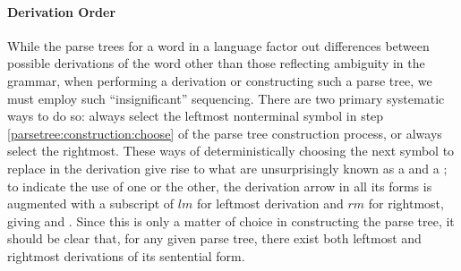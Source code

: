 \paragraph{Derivation Order} While the parse trees for a word in a language factor out differences between possible derivations of the word other than those reflecting ambiguity in the grammar, when performing a derivation or constructing such a parse tree, we must employ such ``insignificant'' sequencing. There are two primary systematic ways to do so: always select the leftmost nonterminal symbol in step \ref{parsetree:construction:choose} of the parse tree construction process, or always select the rightmost. These ways of deterministically choosing the next symbol to replace in the derivation give rise to what are unsurprisingly known as a  and a ; to indicate the use of one or the other, the derivation arrow in all its forms is augmented with a subscript of $lm$ for leftmost derivation and $rm$ for rightmost, giving \derives[][lm] and \derives[][rm]. Since this is only a matter of choice in constructing the parse tree, it should be clear that, for any given parse tree, there exist both leftmost and rightmost derivations of its sentential form. %

